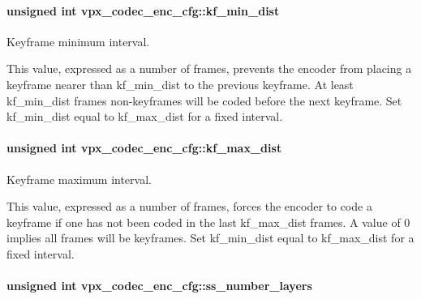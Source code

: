 \paragraph[{\texorpdfstring{kf\+\_\+min\+\_\+dist}{kf_min_dist}}]{\setlength{\rightskip}{0pt plus 5cm}unsigned int vpx\+\_\+codec\+\_\+enc\+\_\+cfg\+::kf\+\_\+min\+\_\+dist}\hypertarget{structvpx__codec__enc__cfg_a0a7b5444ecb09745cbe8d5af17553846}{}\label{structvpx__codec__enc__cfg_a0a7b5444ecb09745cbe8d5af17553846}


Keyframe minimum interval. 

This value, expressed as a number of frames, prevents the encoder from placing a keyframe nearer than kf\+\_\+min\+\_\+dist to the previous keyframe. At least kf\+\_\+min\+\_\+dist frames non-\/keyframes will be coded before the next keyframe. Set kf\+\_\+min\+\_\+dist equal to kf\+\_\+max\+\_\+dist for a fixed interval. 
\paragraph[{\texorpdfstring{kf\+\_\+max\+\_\+dist}{kf_max_dist}}]{\setlength{\rightskip}{0pt plus 5cm}unsigned int vpx\+\_\+codec\+\_\+enc\+\_\+cfg\+::kf\+\_\+max\+\_\+dist}\hypertarget{structvpx__codec__enc__cfg_ae018440136e271743376730413d25a9b}{}\label{structvpx__codec__enc__cfg_ae018440136e271743376730413d25a9b}


Keyframe maximum interval. 

This value, expressed as a number of frames, forces the encoder to code a keyframe if one has not been coded in the last kf\+\_\+max\+\_\+dist frames. A value of 0 implies all frames will be keyframes. Set kf\+\_\+min\+\_\+dist equal to kf\+\_\+max\+\_\+dist for a fixed interval. 
\paragraph[{\texorpdfstring{ss\+\_\+number\+\_\+layers}{ss_number_layers}}]{\setlength{\rightskip}{0pt plus 5cm}unsigned int vpx\+\_\+codec\+\_\+enc\+\_\+cfg\+::ss\+\_\+number\+\_\+layers}\hypertarget{structvpx__codec__enc__cfg_a1e5e1d00b22f2ba8c5c7230f31900f95}{}\label{structvpx__codec__enc__cfg_a1e5e1d00b22f2ba8c5c7230f31900f95}


